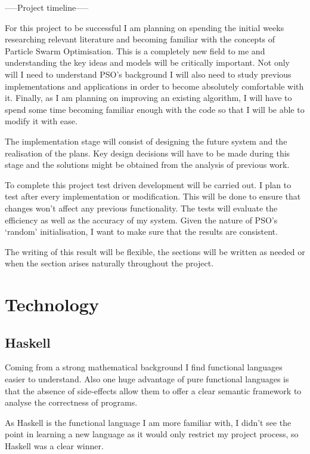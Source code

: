 \documentclass{pdfmx4020}
\begin{document}
   -----Project timeline-----

  For this project to be successful I am planning on spending the initial weeks researching relevant literature and becoming familiar with the concepts of Particle Swarm Optimisation. This is a completely new field to me and understanding the key ideas and models will be critically important. Not only will I need to understand PSO's background I will also need to study previous implementations and applications in order to become absolutely comfortable with it. Finally, as I am planning on improving an existing algorithm, I will have to spend some time becoming familiar enough with the code so that I will be able to modify it with ease.

  The implementation stage will consist of designing the future system and the realisation of the plans. Key design decisions will have to be made during this stage and the solutions might be obtained from the analysis of previous work. 

  To complete this project test driven development will be carried out. I plan to test after every implementation or modification. This will be done to ensure that changes won't affect any previous functionality. The tests will evaluate the efficiency as well as the accuracy of my system. Given the nature of PSO's `random' initialisation,  I want to make sure that the results are consistent. 

  The writing of this result will be flexible, the sections will be written as needed or when the section arises naturally throughout the project. 


  \section{Technology} %
  \label{sec:technology}

    \subsection{Haskell} %
    \label{sub:haskell}
      Coming from a strong mathematical background I find functional languages easier to understand. Also one huge advantage of pure functional languages is that the absence of side-effects allow them to offer a clear semantic framework to analyse the correctness of programs. 

      As Haskell is the functional language I am more familiar with, I didn't see the point in learning a new language as it would only restrict my project process, so Haskell was a clear winner. 
\end{document}
